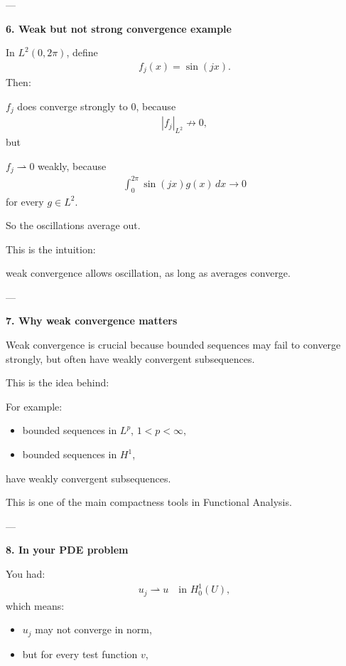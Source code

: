 \documentclass[12pt,a4paper]{report}
\begin{document}
\begin{description}
\begin{description}
---

\item \textbf{6. Weak but not strong convergence example}

In $L^2(0,2\pi)$, define
\begin{align*}
f_j(x)=\sin(jx).
\end{align*}
Then:
\begin{description}
\item $f_j$ does  converge strongly to $0$, because
\begin{align*}
  |f_j|_{L^2}\not\to 0,
\end{align*}
but
\item $f_j\rightharpoonup 0$ weakly, because
\begin{align*}
  \int_0^{2\pi}\sin(jx)g(x)\,dx\to 0
\end{align*}
for every $g\in L^2$.
\end{description}

So the oscillations average out.

This is the intuition:

\> weak convergence allows oscillation, as long as averages converge.

---

\item \textbf{7. Why weak convergence matters}

Weak convergence is crucial because bounded sequences may fail to converge strongly, but often have weakly convergent subsequences.

This is the idea behind:

\> 

For example:
\begin{itemize}
\item bounded sequences in $L^p$, $1<p<\infty$,
\item bounded sequences in $H^1$,
\end{itemize}
have weakly convergent subsequences.

This is one of the main compactness tools in Functional Analysis.

---

\item \textbf{8. In your PDE problem}

You had:
\begin{align*}
u_j \rightharpoonup u \quad\text{in } H_0^1(U),
\end{align*}
which means:
\begin{itemize}
\item $u_j$ may not converge in norm,
\item but for every test function $v$,
\end{itemize}


\end{description}
\end{description}
\end{document}

